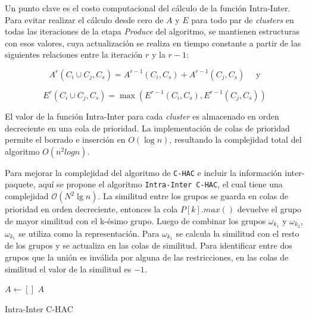 Un punto clave es el costo computacional del cálculo de la función Intra-Inter. Para evitar realizar el cálculo desde cero de $A$ y $E$ para todo par de {\em clusters} en todas las iteraciones de la etapa \emph{Produce} del algoritmo, se  mantienen estructuras con esos valores, cuya actualización se realiza en tiempo constante a partir de las siguientes relaciones entre la iteración $r$ y la $r-1$:

$$A^r(C_i \cup C_j, C_s) = A^{r-1}(C_i,C_s) + A^{r-1}(C_j,C_s) \quad \mbox{ y}$$

$$E^r(C_i \cup C_j,C_s) = \max (E^{r-1}(C_i,C_s),E^{r-1}(C_j,C_s))$$

El valor de la función Intra-Inter para cada {\em cluster} es almacenado en orden decreciente en una cola de prioridad. La implementación de colas de prioridad permite el borrado e inserción en $O(\log n)$, resultando la complejidad total del algoritmo $O(n^2 log n)$.

Para mejorar la complejidad del algoritmo de \texttt{C-HAC} e incluir la información inter-paquete, aquí se propone el algoritmo \texttt{Intra-Inter C-HAC}, el cual tiene una complejidad $\mathcal{O}(N^{2}\lg n)$. La similitud entre los grupos se guarda en colas de prioridad en orden decreciente, entonces la cola $P\left[k\right].max()$ devuelve el grupo de mayor similitud con el k-ésimo grupo. Luego de combinar los grupos $\omega_{k_{1}}$ y $\omega_{k_{2}}$, $\omega_{k_{1}}$ se utiliza como la representación. Para $\omega_{k_{1}}$ se calcula la similitud con el resto de los grupos y se actualiza en las colas de similitud. Para identificar entre dos grupos que la unión es inválida por alguna de las restricciones, en las colas de similitud el valor de la similitud es $-1$.

\begin{algorithm}[H]
\DontPrintSemicolon
\SetAlgoLined
	$A \leftarrow []$\;
	\Return $A$\;
\caption{Intra-Inter C-HAC}\label{alg:Intra-Inter C-HAC}
\end{algorithm}

